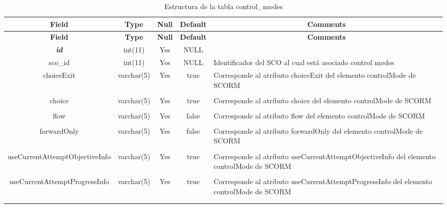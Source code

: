 %
%
\begin{longtable}{c c c c l}
	\multicolumn{1}{c}{\textbf{Field}} &
	\multicolumn{1}{c}{\textbf{Type}} &
	\multicolumn{1}{c}{\textbf{Null}} &
	\multicolumn{1}{c}{\textbf{Default}} &
	\multicolumn{1}{c}{\textbf{Comments}} \\ \hline \hline
\endfirsthead
	\multicolumn{1}{c}{\textbf{Field}} &
	\multicolumn{1}{c}{\textbf{Type}} &
	\multicolumn{1}{c}{\textbf{Null}} &
	\multicolumn{1}{c}{\textbf{Default}} &
	\multicolumn{1}{c}{\textbf{Comments}} \\ \hline \hline
\endhead \endfoot
	\textbf{\textit{id}} & int(11) & Yes & NULL \\ \hline 
	sco\_id & int(11) & Yes & NULL & \parbox[t]{0.35\textwidth}{Identificador del SCO al cual está asociado control modes}\\ \hline 
	choiceExit & varchar(5) & Yes & true & \parbox[t]{0.35\textwidth}{Corresponde al atributo choiceExit del elemento controlMode de SCORM} \\ \\  \hline
	choice & varchar(5) & Yes & true & \parbox[t]{0.35\textwidth}{Corresponde al atributo choice del elemento controlMode de SCORM } \\ \\  \hline
	flow & varchar(5) & Yes & false & \parbox[t]{0.35\textwidth}{Corresponde al atributo flow del elemento controlMode de SCORM} \\ \\  \hline
	forwardOnly & varchar(5) & Yes & false & \parbox[t]{0.35\textwidth}{Corresponde al atributo forwardOnly del elemento controlMode de SCORM} \\ \\  \hline
	useCurrentAttemptObjectiveInfo & varchar(5) & Yes & true & \parbox[t]{0.35\textwidth}{Corresponde al atributo useCurrentAttemptObjectiveInfo del elemento controlMode de SCORM} \\ \\  \hline
	useCurrentAttemptProgressInfo & varchar(5) & Yes & true & \parbox[t]{0.35\textwidth}{Corresponde al atributo useCurrentAttemptProgressInfo del elemento controlMode de SCORM} \\ \\  \hline
 \caption{Estructura de la tabla control\_modes} \label{tab:scorm_control_modes-structure} \\
\end{longtable}

